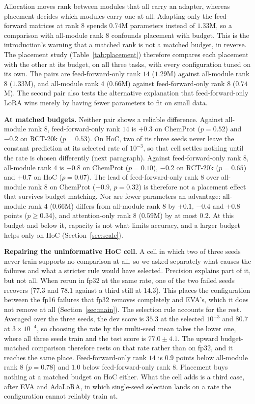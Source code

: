 \documentclass[conference,onecolumn]{IEEEtran}
\begin{document}
Allocation moves rank between modules that all carry an adapter, whereas
placement decides which modules carry one at all. Adapting only the feed-forward
matrices at rank $8$ spends $0.74$M parameters instead of $1.33$M, so a
comparison with all-module rank $8$ confounds placement with budget. This is the
introduction's warning that a matched rank is not a matched budget, in reverse.
The placement study (Table~\ref{tab:placement}) therefore compares each
placement with the other at its budget, on all three tasks, with every
configuration tuned on its own. The pairs are feed-forward-only rank $14$
($1.29$M) against all-module rank $8$ ($1.33$M), and all-module rank $4$
($0.66$M) against feed-forward-only rank $8$ ($0.74$M). The second pair also
tests the alternative explanation that feed-forward-only LoRA wins merely by
having fewer parameters to fit on small data.

\noindent\textbf{At matched budgets.} Neither pair shows a reliable difference.
Against all-module rank $8$, feed-forward-only rank $14$ is $+0.3$ on ChemProt
($p = 0.52$) and $-0.2$ on RCT-20k ($p = 0.53$). On HoC, two of its three seeds
never leave the constant prediction at its selected rate of $10^{-3}$, so that
cell settles nothing until the rate is chosen differently (next paragraph).
Against feed-forward-only rank $8$, all-module rank $4$ is $-0.8$ on
ChemProt ($p = 0.10$), $-0.2$ on RCT-20k ($p = 0.65$) and $+0.7$ on HoC
($p = 0.07$). The lead of feed-forward-only rank $8$ over all-module rank $8$ on
ChemProt ($+0.9$, $p = 0.32$) is therefore not a placement effect that survives
budget matching. Nor are fewer parameters an advantage: all-module rank $4$
($0.66$M) differs from all-module rank $8$ by $+0.1$, $-0.4$ and $+0.8$ points
($p \ge 0.34$), and attention-only rank $8$ ($0.59$M) by at most $0.2$. At this
budget and below it, capacity is not what limits accuracy, and a larger budget
helps only on HoC (Section~\ref{sec:scale}).

\noindent\textbf{Repairing the uninformative HoC cell.} A cell in which two of
three seeds never train supports no comparison at all, so we asked separately
what causes the failures and what a stricter rule would have selected. Precision
explains part of it, but not all. When rerun in fp32 at the same rate, one of
the two failed seeds recovers ($77.3$ and $78.1$ against a third still at
$14.3$). This places the configuration between the fp16 failures that fp32
removes completely and EVA's, which it does not remove at all
(Section~\ref{sec:main}). The selection rule accounts for the rest. Averaged
over the three seeds, the dev score is $35.3$ at the selected $10^{-3}$ and
$80.7$ at $3\times10^{-4}$, so choosing the rate by the multi-seed mean takes
the lower one, where all three seeds train and the test score is $77.0\pm4.1$.
The upward budget-matched comparison therefore rests on that rate rather than on
fp32, and it reaches the same place. Feed-forward-only rank $14$ is $0.9$ points
below all-module rank $8$ ($p = 0.78$) and $1.0$ below feed-forward-only rank
$8$. Placement buys nothing at a matched budget on HoC either. What the cell
adds is a third case, after EVA and AdaLoRA, in which single-seed selection
lands on a rate the configuration cannot reliably train at.
\end{document}
